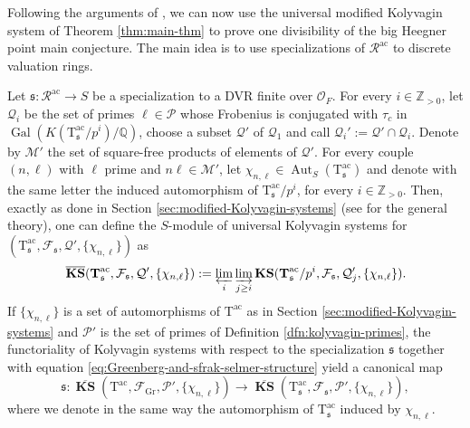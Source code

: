 \documentclass[12pt,reqno]{amsart}
\theoremstyle{definition}
\theoremstyle{remark}
\newcommand{\numberset}{\mathbb}
\newcommand{\Q}{\numberset{Q}}
\newcommand{\Z}{\numberset{Z}}
\newcommand{\OF}{\mathcal{O}_F}
\newcommand{\T}{\boldsymbol{\mathrm{T}}}
\newcommand{\calR}{\mathcal{R}}
\DeclareMathOperator{\Gal}{Gal}
\DeclareMathOperator{\Aut}{Aut}
\DeclareMathOperator{\ks}{KS}
\newcommand{\KS}{\boldsymbol{\ks}}
\newcommand{\ac}{\mathrm{ac}}
\newcommand{\Gr}{\mathrm{Gr}}
\newcommand{\sfrak}{\mathfrak{s}}
\begin{document}
Following the arguments of \cite[§5-6]{Fouquet13:Dihedral}, we can now use the universal modified Kolyvagin system of Theorem \ref{thm:main-thm} to prove one divisibility of the big Heegner point main conjecture. The main idea is to use specializations of $\calR^\ac$ to discrete valuation rings.

Let $\sfrak\colon \calR^\ac\to S$ be a specialization to a DVR finite over $\OF$. For every $i\in\Z_{>0}$, let $\mathcal{Q}_i$ be the set of primes $\ell\in\mathcal{P}$ whose Frobenius is conjugated with $\tau_c$ in $\Gal(K(\T^\ac_\sfrak/p^i)/\Q)$, choose a subset $\mathcal{Q}'$ of $\mathcal{Q}_1$ and call $\mathcal{Q}_i':=\mathcal{Q}'\cap\mathcal{Q}_i$. Denote by $\mathcal{M}'$ the set of square-free products of elements of $\mathcal{Q}'$.  For every couple $(n,\ell)$ with $\ell$ prime and $n\ell\in\mathcal{M}'$, let $\chi_{n,\ell}\in\Aut_{S}(\T^{\ac}_\sfrak)$ and denote with the same letter the induced automorphism of $\T^{\ac}_\sfrak/p^i$, for every $i\in\Z_{>0}$. Then, exactly as done in Section \ref{sec:modified-Kolyvagin-systems} (see \cite[Section 2.7]{mastella-zerman2025:anticyclotomic} for the general theory), one can define the $S$-module of universal Kolyvagin systems for $(\T^\ac_\sfrak,\mathcal{F}_\sfrak,\mathcal{Q}',\{\chi_{n,\ell}\})$ as
\begin{equation*}
            \overline{\KS}(\T^{\ac}_\sfrak,\mathcal{F}_\sfrak,\mathcal{Q}', \{\chi_{n,\ell}\}):=\varprojlim_{i}\varinjlim_{j\ge i} \KS(\T^\ac_\sfrak/p^i,\mathcal{F}_\sfrak,\mathcal{Q}_{j}', \{\chi_{n,\ell}\}).
\end{equation*}
If $\{\chi_{n,\ell}\}$ is a set of automorphisms of $\T^\ac$ as in Section \ref{sec:modified-Kolyvagin-systems} and $\mathcal{P}'$ is the set of primes of Definition \ref{dfn:kolyvagin-primes}, the functoriality of Kolyvagin systems with respect to the specialization $\sfrak$ together with equation \eqref{eq:Greenberg-and-sfrak-selmer-structure} yield a canonical map
\begin{equation}\label{eq:specialization-kolyvagin-system}
    \sfrak\colon\overline{\KS}(\T^\ac,\mathcal{F}_\Gr,\mathcal{P}',\{\chi_{n,\ell}\})\longrightarrow \overline{\KS}(\T_\sfrak^\ac,\mathcal{F}_\sfrak,\mathcal{P}',\{\chi_{n,\ell}\}),
\end{equation}
where we denote in the same way the automorphism of $\T_\sfrak^\ac$ induced by $\chi_{n,\ell}$. 
\end{document}
